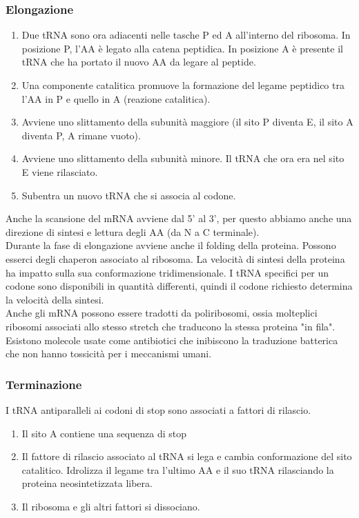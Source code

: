         \subsubsection{Elongazione}
            \begin{enumerate}
                \item Due tRNA sono ora adiacenti nelle tasche P ed A all'interno del ribosoma. In posizione P, l'AA è legato alla catena peptidica. In posizione A è presente il tRNA che ha portato il nuovo AA da legare al peptide.
                \item Una componente catalitica promuove la formazione del legame peptidico tra l'AA in P e quello in A (reazione catalitica). 
                \item Avviene uno slittamento della subunità maggiore (il sito P diventa E, il sito A diventa P, A rimane vuoto). 
                \item Avviene uno slittamento della subunità minore. Il tRNA che ora era nel sito E viene rilasciato.
                \item Subentra un nuovo tRNA che si associa al codone.
            \end{enumerate}
            Anche la scansione del mRNA avviene dal 5' al 3', per questo abbiamo anche una direzione di sintesi e lettura degli AA (da N a C terminale).\\
            Durante la fase di elongazione avviene anche il folding della proteina. Possono esserci degli chaperon associato al ribosoma. La velocità di sintesi della proteina ha impatto sulla sua conformazione tridimensionale. I tRNA specifici per un codone sono disponibili in quantità differenti, quindi il codone richiesto determina la velocità della sintesi. \\
            Anche gli mRNA possono essere tradotti da poliribosomi, ossia molteplici ribosomi associati allo stesso stretch che traducono la stessa proteina "in fila". Esistono molecole usate come antibiotici che inibiscono la traduzione batterica che non hanno tossicità per i meccanismi umani.
    
        \subsubsection{Terminazione}
            I tRNA antiparalleli ai codoni di stop sono associati a fattori di rilascio.
            \begin{enumerate}
                \item Il sito A contiene una sequenza di stop
                \item Il fattore di rilascio associato al tRNA si lega e cambia conformazione del sito catalitico. Idrolizza il legame tra l'ultimo AA e il suo tRNA rilasciando la proteina neosintetizzata libera. 
                \item Il ribosoma e gli altri fattori si dissociano.
            \end{enumerate}
        
